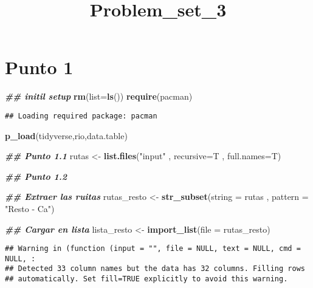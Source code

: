 \documentclass[
]{article}
\title{Problem\_set\_3}
\author{}
\date{\vspace{-2.5em}}
\newenvironment{Shaded}{\begin{snugshade}}{\end{snugshade}}
\newcommand{\AttributeTok}[1]{\textcolor[rgb]{0.13,0.29,0.53}{#1}}
\newcommand{\DocumentationTok}[1]{\textcolor[rgb]{0.56,0.35,0.01}{\textbf{\textit{#1}}}}
\newcommand{\FunctionTok}[1]{\textcolor[rgb]{0.13,0.29,0.53}{\textbf{#1}}}
\newcommand{\NormalTok}[1]{#1}
\newcommand{\OtherTok}[1]{\textcolor[rgb]{0.56,0.35,0.01}{#1}}
\newcommand{\StringTok}[1]{\textcolor[rgb]{0.31,0.60,0.02}{#1}}
\begin{document}
\maketitle

\hypertarget{punto-1}{%
\section{Punto 1}\label{punto-1}}

\begin{Shaded}
\begin{Highlighting}[]
\DocumentationTok{\#\# initil setup}
\FunctionTok{rm}\NormalTok{(}\AttributeTok{list=}\FunctionTok{ls}\NormalTok{())}
\FunctionTok{require}\NormalTok{(pacman)}
\end{Highlighting}
\end{Shaded}

\begin{verbatim}
## Loading required package: pacman
\end{verbatim}

\begin{Shaded}
\begin{Highlighting}[]
\FunctionTok{p\_load}\NormalTok{(tidyverse,rio,data.table)}

\DocumentationTok{\#\# Punto 1.1}
\NormalTok{rutas }\OtherTok{\textless{}{-}} \FunctionTok{list.files}\NormalTok{(}\StringTok{"input"}\NormalTok{ , }\AttributeTok{recursive=}\NormalTok{T , }\AttributeTok{full.names=}\NormalTok{T)}

\DocumentationTok{\#\# Punto 1.2 }

\DocumentationTok{\#\# Extraer las ruitas}
\NormalTok{rutas\_resto }\OtherTok{\textless{}{-}} \FunctionTok{str\_subset}\NormalTok{(}\AttributeTok{string =}\NormalTok{ rutas , }\AttributeTok{pattern =} \StringTok{"Resto {-} Ca"}\NormalTok{)}

\DocumentationTok{\#\# Cargar en lista}
\NormalTok{lista\_resto }\OtherTok{\textless{}{-}} \FunctionTok{import\_list}\NormalTok{(}\AttributeTok{file =}\NormalTok{ rutas\_resto)}
\end{Highlighting}
\end{Shaded}

\begin{verbatim}
## Warning in (function (input = "", file = NULL, text = NULL, cmd = NULL, :
## Detected 33 column names but the data has 32 columns. Filling rows
## automatically. Set fill=TRUE explicitly to avoid this warning.
\end{verbatim}
\end{document}
